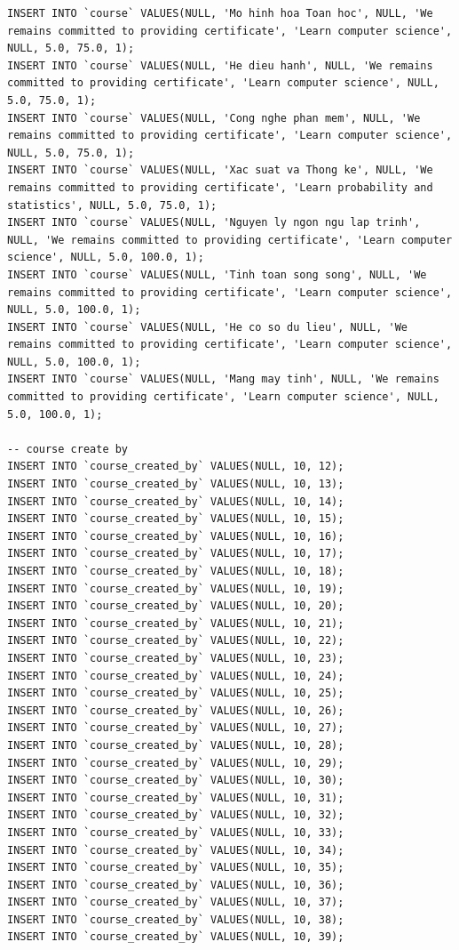 \documentclass[12pt,a4paper,titlepage]{article}
\begin{document}
\begin{lstlisting}
INSERT INTO `course` VALUES(NULL, 'Mo hinh hoa Toan hoc', NULL, 'We remains committed to providing certificate', 'Learn computer science', NULL, 5.0, 75.0, 1);
INSERT INTO `course` VALUES(NULL, 'He dieu hanh', NULL, 'We remains committed to providing certificate', 'Learn computer science', NULL, 5.0, 75.0, 1);
INSERT INTO `course` VALUES(NULL, 'Cong nghe phan mem', NULL, 'We remains committed to providing certificate', 'Learn computer science', NULL, 5.0, 75.0, 1);
INSERT INTO `course` VALUES(NULL, 'Xac suat va Thong ke', NULL, 'We remains committed to providing certificate', 'Learn probability and statistics', NULL, 5.0, 75.0, 1);
INSERT INTO `course` VALUES(NULL, 'Nguyen ly ngon ngu lap trinh', NULL, 'We remains committed to providing certificate', 'Learn computer science', NULL, 5.0, 100.0, 1);
INSERT INTO `course` VALUES(NULL, 'Tinh toan song song', NULL, 'We remains committed to providing certificate', 'Learn computer science', NULL, 5.0, 100.0, 1);
INSERT INTO `course` VALUES(NULL, 'He co so du lieu', NULL, 'We remains committed to providing certificate', 'Learn computer science', NULL, 5.0, 100.0, 1);
INSERT INTO `course` VALUES(NULL, 'Mang may tinh', NULL, 'We remains committed to providing certificate', 'Learn computer science', NULL, 5.0, 100.0, 1);

-- course create by
INSERT INTO `course_created_by` VALUES(NULL, 10, 12);
INSERT INTO `course_created_by` VALUES(NULL, 10, 13);
INSERT INTO `course_created_by` VALUES(NULL, 10, 14);
INSERT INTO `course_created_by` VALUES(NULL, 10, 15);
INSERT INTO `course_created_by` VALUES(NULL, 10, 16);
INSERT INTO `course_created_by` VALUES(NULL, 10, 17);
INSERT INTO `course_created_by` VALUES(NULL, 10, 18);
INSERT INTO `course_created_by` VALUES(NULL, 10, 19);
INSERT INTO `course_created_by` VALUES(NULL, 10, 20);
INSERT INTO `course_created_by` VALUES(NULL, 10, 21);
INSERT INTO `course_created_by` VALUES(NULL, 10, 22);
INSERT INTO `course_created_by` VALUES(NULL, 10, 23);
INSERT INTO `course_created_by` VALUES(NULL, 10, 24);
INSERT INTO `course_created_by` VALUES(NULL, 10, 25);
INSERT INTO `course_created_by` VALUES(NULL, 10, 26);
INSERT INTO `course_created_by` VALUES(NULL, 10, 27);
INSERT INTO `course_created_by` VALUES(NULL, 10, 28);
INSERT INTO `course_created_by` VALUES(NULL, 10, 29);
INSERT INTO `course_created_by` VALUES(NULL, 10, 30);
INSERT INTO `course_created_by` VALUES(NULL, 10, 31);
INSERT INTO `course_created_by` VALUES(NULL, 10, 32);
INSERT INTO `course_created_by` VALUES(NULL, 10, 33);
INSERT INTO `course_created_by` VALUES(NULL, 10, 34);
INSERT INTO `course_created_by` VALUES(NULL, 10, 35);
INSERT INTO `course_created_by` VALUES(NULL, 10, 36);
INSERT INTO `course_created_by` VALUES(NULL, 10, 37);
INSERT INTO `course_created_by` VALUES(NULL, 10, 38);
INSERT INTO `course_created_by` VALUES(NULL, 10, 39);


\end{lstlisting}
\end{document}
